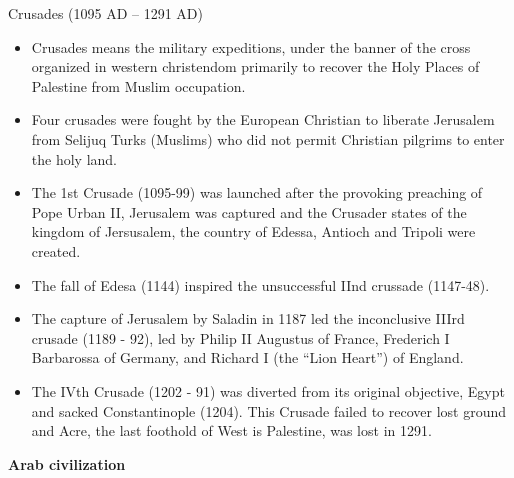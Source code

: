 \documentclass[
  openany]{book}
\providecommand{\tightlist}{%
  \setlength{\itemsep}{0pt}\setlength{\parskip}{0pt}}
\begin{document}
Crusades (1095 AD -- 1291 AD)

\begin{itemize}
\tightlist
\item
  Crusades means the military expeditions, under the banner of the cross organized in western christendom primarily to recover the Holy Places of Palestine from Muslim occupation.
\item
  Four crusades were fought by the European Christian to liberate Jerusalem from Selijuq Turks (Muslims) who did not permit Christian pilgrims to enter the holy land.
\item
  The 1st Crusade (1095-99) was launched after the provoking preaching of Pope Urban II, Jerusalem was captured and the Crusader states of the kingdom of Jersusalem, the country of Edessa, Antioch and Tripoli were created.
\item
  The fall of Edesa (1144) inspired the unsuccessful IInd crussade (1147-48).
\item
  The capture of Jerusalem by Saladin in 1187 led the inconclusive IIIrd crusade (1189 - 92), led by Philip II Augustus of France, Frederich I Barbarossa of Germany, and Richard I (the ``Lion Heart'') of England.
\item
  The IVth Crusade (1202 - 91) was diverted from its original objective, Egypt and sacked Constantinople (1204). This Crusade failed to recover lost ground and Acre, the last foothold of West is Palestine, was lost in 1291.
\end{itemize}

\textbf{Arab civilization}
\end{document}
